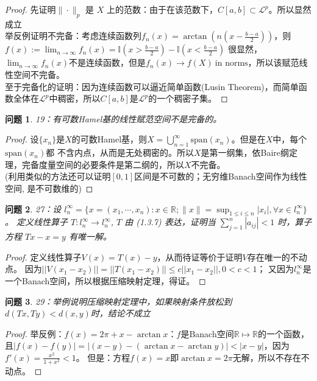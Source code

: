 \documentclass[a4paper, 12pt]{ctexart}
\newtheorem*{theorem}{问题}%
\begin{document}
\begin{proof}
先证明$\|\cdot\|_{p}$ 是 $X$ 上的范数：由于在该范数下，$C[a,b]\subset \mathscr{L}^p$。所以显然成立
\\
举反例证明不完备：考虑连续函数列$f_n(x)=\arctan(n(x-\frac{b-a}{2}))$，则$f(x):=\lim_{n\to \infty}f_n(x)=\mathbb{I}(x>\frac{b-a}{2})-\mathbb{I}(x<\frac{b-a}{2})$
很显然，$\lim_{n\to \infty}f_n(x)$不是连续函数，但是$f_n(x)\to f(X) \ \text{in norms}$，所以该赋范线性空间不完备。
\\
至于完备化的证明：因为连续函数可以逼近简单函数(Lusin Theorem)，而简单函数全体在$\mathscr{L}^p$中稠密，所以$C[a,b]$是$\mathscr{L}^p$的一个稠密子集。
\end{proof}

\begin{theorem}
19：有可数Hamel基的线性赋范空间不是完备的。
\end{theorem}

\begin{proof}
设$\{x_n\}$是$X$的可数Hamel基，则$X=\bigcup_{n=1}^{\infty}\text{span}(x_n)$。但是在$X$中，每个$\text{span}(x_n)$都
不含内点，从而是无处稠密的。所以$X$是第一纲集，依Baire纲定理，完备度量空间的必要条件是第二纲的，所以$X$不完备。
\\(利用类似的方法还可以证明$[0,1]$区间是不可数的；无穷维Banach空间作为线性空间, 是不可数维的)
\end{proof}



\begin{theorem}
27：设 $l_{n}^\infty = \{x = (x_1, \cdots, x_n): x \in \mathbb{R}; \|x\| = \sup_{1 \leqslant i \leqslant n} |x_i|, \forall x \in l_{n}^\infty \}$。
定义线性算子 $T: l_{n}^\infty \to l_{n}^\infty$, $T$ 由 (1.3.7) 表达，证明当 $\sum_{j=1}^{n}|a_{ij}| < 1$ 时，算子方程 $Tx - x = y$ 有唯一解。
\end{theorem}

\begin{proof}
定义线性算子$V(x)=T(x)-y$，从而待证等价于证明$V$存在唯一的不动点。
因为$\lvert \lvert V(x_{1}-x_{2}) \rvert \rvert=\lvert \lvert T(x_{1}-x_{2}) \rvert \rvert\leq c\lvert \lvert x_{1}-x_{2} \rvert \rvert,0<c<1$；
又因为$l_{n}^\infty$是一个Banach空间，所以根据压缩映射定理，得证。
\end{proof}

\begin{theorem}
29：举例说明压缩映射定理中，如果映射条件放松到$d(Tx,Ty)<d(x,y)$时，结论不成立
\end{theorem}

\begin{proof}
举反例：$f(x)=2\pi+x-\arctan x$：$f$是Banach空间$\mathbb{R}\mapsto \mathbb{R}$的一个函数，
且$|f(x)-f(y)|=|(x-y)-(\arctan x-\arctan y)|<|x-y|$，因为$f'(x)=\frac{x^2}{1+x^2}<1$。
但是：方程$f(x)=x$即$\arctan x=2\pi$无解，所以不存在不动点。
\end{proof}
\end{document}
